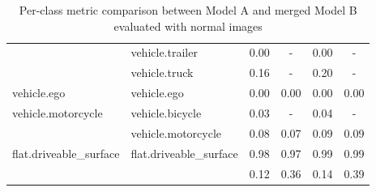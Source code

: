 \begin{table}[h]
\begin{tabular}{llcccc}
     & vehicle.trailer & 0.00 & - & 0.00 & - \\
     & vehicle.truck & 0.16 & - & 0.20 & - \\
    \midrule
    vehicle.ego & vehicle.ego & 0.00 & 0.00 & 0.00 & 0.00 \\
    \midrule
    vehicle.motorcycle & vehicle.bicycle & 0.03 & - & 0.04 & - \\
     & vehicle.motorcycle & 0.08 & 0.07 & 0.09 & 0.09 \\
    \midrule
    flat.driveable\_surface & flat.driveable\_surface & 0.98 & 0.97 & 0.99 & 0.99 \\
    \bottomrule
     & & 0.12 & 0.36 & 0.14 & 0.39 \\
    \bottomrule
    \end{tabular}
    \caption{Per-class metric comparison between Model A and merged Model B evaluated with normal images}
    \label{tab:merging_comparison_normal}
\end{table}
    


